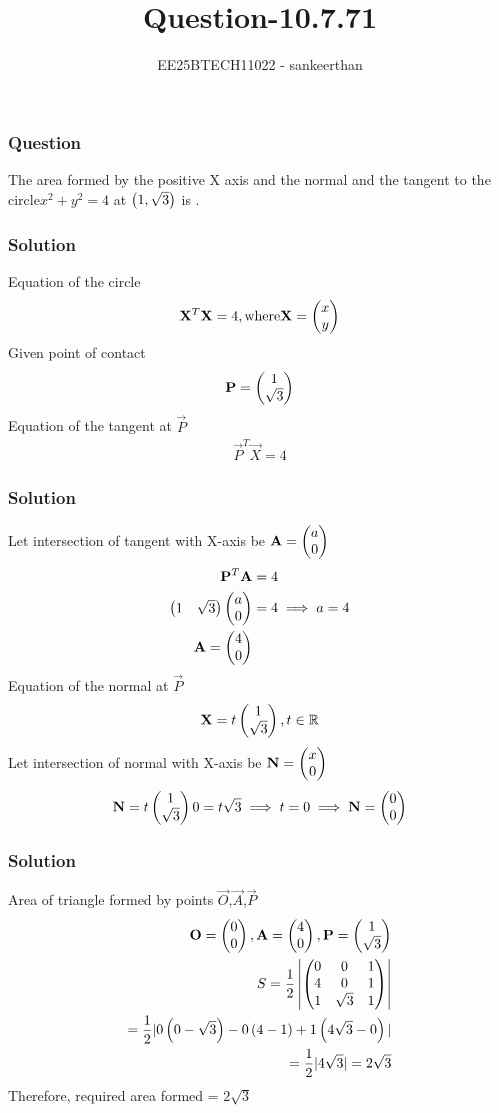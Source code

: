 \documentclass{beamer}
\title{Question-10.7.71}
\author{EE25BTECH11022 - sankeerthan}
\date{}
\begin{document}
\frame{\titlepage}

\begin{frame}
\frametitle{Question}
The area formed by the positive X axis and the normal and the tangent to the circle$x^2 + y^2 = 4$ at $\left(1,\sqrt{3}\right)$ is \underline{\phantom{imagine}}.
\end{frame}

\begin{frame}
\frametitle{Solution}
Equation of the circle
\begin{align}
\mathbf{X}^T \mathbf{X} = 4 ,\text{where}\mathbf{X} =\begin{pmatrix}x \\ y\end{pmatrix}
\end{align}
Given point of contact
\begin{align}
\mathbf{P} = \begin{pmatrix}1 \\ \sqrt{3}\end{pmatrix}
\end{align}
Equation of the tangent at $\vec{P}$
\begin{align}
\vec{P}^T \vec{X} = 4
\end{align}
\end{frame}

\begin{frame}
\frametitle{Solution}
Let intersection of tangent with X-axis be $\mathbf{A} =\begin{pmatrix}a \\ 0\end{pmatrix}$
\begin{align}
\mathbf{P}^T \mathbf{A} &= 4  \\
\begin{pmatrix}1 & \sqrt{3}\end{pmatrix}\begin{pmatrix}a \\ 0\end{pmatrix} &= 4 \implies a = 4 \\
\mathbf{A} = \begin{pmatrix}4 \\ 0\end{pmatrix}
\end{align}
Equation of the normal at $\vec{P}$
\begin{align}
\mathbf{X} = t\begin{pmatrix}1 \\ \sqrt{3}\end{pmatrix},t \in \mathbb{R}
\end{align}
Let intersection of normal with X-axis be $\mathbf{N} = \begin{pmatrix}x \\ 0\end{pmatrix}$ 
\begin{align}
\mathbf{N}= t\begin{pmatrix}1 \\ \sqrt{3}\end{pmatrix}
0 = t\sqrt{3} \implies t = 0 \implies \mathbf{N} = \begin{pmatrix}0 \\ 0\end{pmatrix}
\end{align}
\end{frame}
\begin{frame}
\frametitle{Solution}
Area of triangle formed by points $\vec{O}$,$\vec{A}$,$\vec{P}$
\begin{align}
\mathbf{O} =\begin{pmatrix}0 \\ 0\end{pmatrix},\mathbf{A} =\begin{pmatrix}4 \\ 0\end{pmatrix},\mathbf{P} = \begin{pmatrix}1 \\ \sqrt{3}\end{pmatrix}  \\
S =\frac{1}{2}\left|\begin{pmatrix}0 & 0 & 1 \\4 & 0 & 1 \\1 & \sqrt{3} & 1\end{pmatrix} \right| \\
=\frac{1}{2}|0\left(0-\sqrt{3}\right)-0\left(4-1\right)+1\left(4\sqrt{3}-0\right)| \\
=\frac{1}{2}|4\sqrt{3}|=2\sqrt{3} 
\end{align}
Therefore, required area formed = $2\sqrt{3}$

\end{frame}
\end{document}
